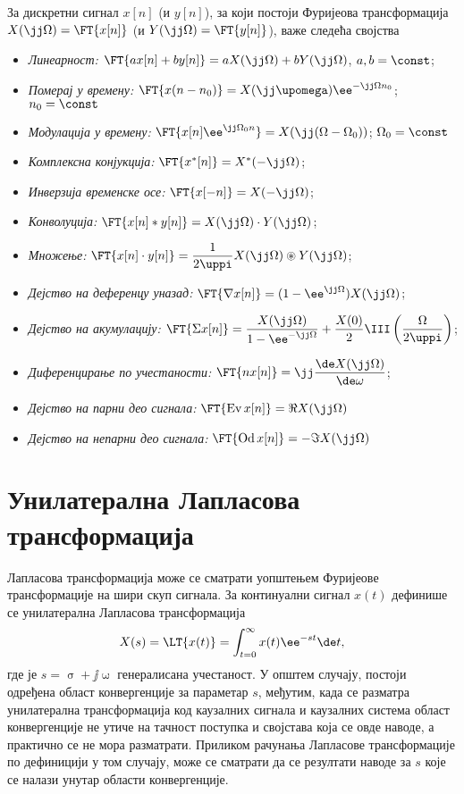 За дискретни сигнал $x[n]$ (и $y[n]$), за који постоји Фуријеова трансформација
$X(\jj\Omega) = \FT{x[n]}$ (и $Y(\jj\Omega) = \FT{y[n]}$), важе следећа својства
\begin{itemize}
    \item \emph{Линеарност:} $\FT{ax[n] + by[n]} = a X(\jj\Omega) + b Y(\jj\Omega)$, \qquad $a,b = \const$;
    \item \emph{Померај у времену:} $\FT{x(n-n_0)} = X(\jj\upomega) \ee^{-\jj\Omega n_0}$; \qquad $n_0 = \const$
    \item \emph{Модулација у времену:} $\FT{x[n] \ee^{\jj\Omega_0 n}} = X(\jj(\Omega - \Omega_0))$; \qquad $\Omega_0 = \const$
    \item \emph{Комплексна конјукција:} $\FT{x^{\ast}[n] } = X^{\ast}(-\jj\Omega)$; 
    \item \emph{Инверзија временске осе:} $\FT{x[-n] } = X(-\jj\Omega)$; 
    \item \emph{Конволуција:} $\FT{x[n] \ast y[n]} = X(\jj\Omega) \cdot Y(\jj\Omega)$; 
    \item \emph{Множење:} $\FT{x[n] \cdot y[n]} = \dfrac{1}{2\uppi} X(\jj\Omega) \circledast Y(\jj\Omega)$; 
    \item \emph{Дејство на деференцу уназад:} $ \FT{ \nabla x[n] } = (1 - \ee^{\jj\Omega}) X(\jj\Omega) $;
    \item \emph{Дејство на акумулацију:} $ \FT{\Sigma x[n]} =  
    \dfrac{X(\jj\Omega)}{1 - \ee^{-\jj\Omega}} + \dfrac{X(0)}{2} \III\left(
        \dfrac{\Omega}{2\uppi}
    \right)
    $;
    \item \emph{Диференцирање по учестаности:} 
    $
    \FT{ n x[n] } = \jj \dfrac{\de X(\jj\Omega)}{\de \omega}
    $;
    \item \emph{Дејство на парни део сигнала:}
    $
    \FT{ \operatorname{Ev}x[n]} = \Re{X(\jj\Omega)}
    $
    \item \emph{Дејство на непарни део сигнала:}
    $
    \FT{ \operatorname{Od}x[n]} = -\Im{X(\jj\Omega)}
    $
    
\end{itemize} 


\section*{Унилатерална Лапласова трансформација}

Лапласова трансформација може се сматрати уопштењем Фуријеове трансформације на шири скуп сигнала. 
За континуални сигнал $x(t)$ дефинише се унилатерална Лапласова трансформација
\begin{equation}
    X(s) = \LT{x(t)} = \int_{t = 0}^\infty x(t) \ee^{-st} \de t, 
\end{equation}
где је $s = \upsigma + \jj\upomega$ генералисана учестаност. У општем случају, постоји одређена област конвергенције за 
параметар $s$, међутим, када се разматра унилатерална трансформација код каузалних сигнала и каузалних система област 
конвергенције не утиче на тачност поступка и својстава која се овде наводе, а практично се не мора разматрати. 
Приликом рачунања Лапласове трансформације по дефиницији у том случају, може се сматрати да се резултати наводе за $s$ 
које се налази унутар области конвергенције. 

